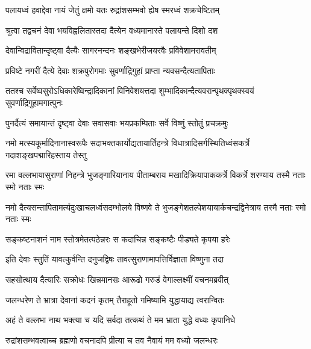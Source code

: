\twolineshloka
{पलायध्वं हवाद्देवा नायं जेतुं क्षमो यतः}
{रुद्रांशसम्भवो ह्येष स्मरध्वं शक्रचेष्टितम्} %

\twolineshloka
{श्रुत्वा तद्वचनं देवा भयविह्वलितास्तदा}
{दैत्येन वध्यमानास्ते पलायन्ते दिशो दश} %

\twolineshloka
{देवान्विद्रावितान्दृष्ट्वा दैत्यैः सागरनन्दनः}
{शङ्खभेरीजयरवैः प्रविवेशामरावतीम्} %

\twolineshloka
{प्रविष्टे नगरीं दैत्ये देवाः शक्रपुरोगमाः}
{सुवर्णाद्रिगुहां प्राप्ता न्यवसन्दैत्यतापिताः} %

\twolineshloka
{ततश्च सर्वेष्वसुरोऽधिकारेष्विन्द्रादिकानां विनिवेशयत्तदा}
{शुम्भादिकान्दैत्यवरान्पृथक्पृथक्स्वयं सुवर्णाद्रिगुहामगात्पुनः} %





\twolineshloka
{पुनर्दैत्यं समायान्तं दृष्ट्वा देवाः सवासवाः}
{भयप्रकम्पिताः सर्वे विष्णुं स्तोतुं प्रचक्रमुः} %

\twolineshloka
{नमो मत्स्यकूर्मादिनानास्वरूपैः सदाभक्तकार्योद्यतायार्तिहन्त्रे}
{विधात्रादिसर्गस्थितिध्वंसकर्त्रे गदाशङ्खपद्मारिहस्ताय तेस्तु} %

\twolineshloka
{रमा वल्लभायासुराणां निहन्त्रे भुजङ्गारियानाय पीताम्बराय}
{मखादिक्रियापाककर्त्रे विकर्त्रे शरण्याय तस्मै नताः स्मो नताः स्मः} %

\twolineshloka
{नमो दैत्यसन्तापितामर्त्यदुःखाचलध्वंसदम्भोलये विष्णवे ते}
{भुजङ्गेशतल्पेशयायार्कचन्द्रद्विनेत्राय तस्मै नताः स्मो नताः स्मः} %


\twolineshloka
{सङ्कष्टनाशनं नाम स्तोत्रमेतत्पठेन्नरः}
{स कदाचिन्न सङ्कष्टैः पीड्यते कृपया हरेः} %

\twolineshloka
{इति देवाः स्तुतिं यावत्कुर्वन्ति दनुजद्विषः}
{तावत्सुराणामापत्तिर्विज्ञाता विष्णुना तदा} %

\twolineshloka
{सहसोत्थाय दैत्यारिः सक्रोधः खिन्नमानसः}
{आरूढो गरुडं वेगाल्लक्ष्मीं वचनमब्रवीत्} %


\twolineshloka
{जलन्धरेण ते भ्रात्रा देवानां कदनं कृतम्}
{तैराहूतो गमिष्यामि युद्धायाद्य त्वरान्वितः} %


\twolineshloka
{अहं ते वल्लभा नाथ भक्त्या च यदि सर्वदा}
{तत्कथं ते मम भ्राता युद्धे वध्यः कृपानिधे} %


\twolineshloka
{रुद्रांशसम्भवत्वाच्च ब्रह्मणो वचनादपि}
{प्रीत्या च तव नैवायं मम वध्यो जलन्धरः} %


